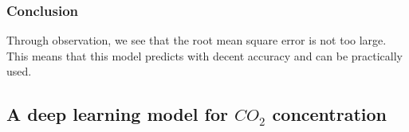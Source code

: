 \documentclass[a4paper]{article}
\numberwithin{equation}{section}
\begin{document}
\subsubsection{Conclusion}
Through observation, we see that the root mean square error is not too large. This means that this model predicts with decent accuracy and can be practically used.

\subsection{A deep learning model for \texorpdfstring{\( CO_2 \)}{} concentration}

\newpage

\printbibliography[heading=bibintoc]
\end{document}
